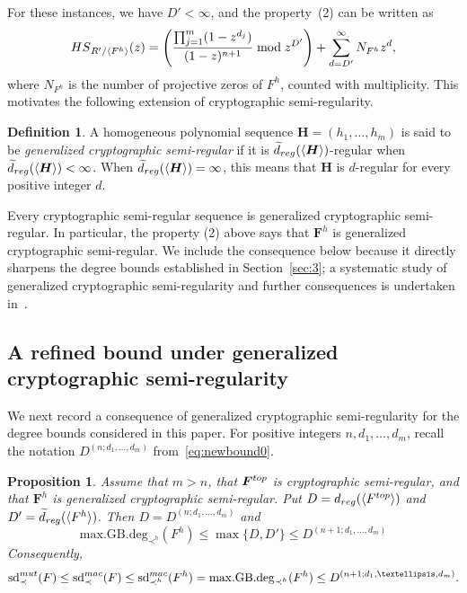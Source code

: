 \documentclass{article}
\newtheorem{proposition}[theorem]{Proposition}
\theoremstyle{definition}
\newtheorem{definition}[theorem]{Definition}
\theoremstyle{plain}
\theoremstyle{plain}
\theoremstyle{plain}
\theoremstyle{plain}
\numberwithin{equation}{subsection}
\begin{document}
For these instances, we have $D'<\infty$, and the property~{\rm (2)} can be written as
\[
{\rm HS}_{R'/\langle F^h\rangle}(z)
=
\left(
\frac{\prod_{j=1}^m(1-z^{d_j})}
     {(1-z)^{n+1}}
\bmod z^{D'}
\right)
+
\sum_{d=D'}^\infty N_{F^h}z^d,
\]
where $N_{F^h}$ is the number of projective zeros of $F^h$, counted with multiplicity.
This motivates the following extension of cryptographic semi-regularity.

\begin{definition}
A homogeneous polynomial sequence $\bm H=(h_1,\ldots,h_m)$ is said to be \emph{generalized cryptographic semi-regular} if it is $\widetilde d_{\rm reg}(\langle\bm H\rangle)$-regular when $\widetilde d_{\rm reg}(\langle\bm H\rangle)<\infty$.
When $\widetilde d_{\rm reg}(\langle\bm H\rangle)=\infty$, this means that $\bm H$ is $d$-regular for every positive integer $d$.
\end{definition}

Every cryptographic semi-regular sequence is generalized cryptographic semi-regular.
In particular, the property {\rm (2)} above says that $\bm F^h$ is generalized cryptographic semi-regular.
We include the consequence below because it directly sharpens the degree bounds established in Section~\ref{sec:3}; a systematic study of generalized cryptographic semi-regularity and further consequences is undertaken in~\cite{KY2}.

\subsection{A refined bound under generalized cryptographic semi-regularity}

We next record a consequence of generalized cryptographic semi-regularity for the degree bounds considered in this paper.
For positive integers $n,d_1,\ldots,d_m$, recall the notation $D^{(n;d_1,\ldots,d_m)}$ from~\eqref{eq:newbound0}.

\begin{proposition}\label{prop:gen-csr-bound}
Assume that $m>n$, that $\bm F^{\rm top}$ is cryptographic semi-regular, and that $\bm F^h$ is generalized cryptographic semi-regular.
Put $D=d_{\rm reg}(\langle F^{\rm top}\rangle)$ and $D'=\widetilde d_{\rm reg}(\langle F^h\rangle)$.
Then $D=D^{(n;d_1,\ldots,d_m)}$ and
\begin{equation}\label{eq:Dnew}
\mathrm{max.GB.deg}_{\prec^h} (F^h) \leq \max \{ D,D'\} \leq  D^{(n+1;d_1,\ldots,d_m)}
\end{equation}
Consequently,
\[
\mathrm{sd}^{\rm mut}_{\prec}(F) \le \mathrm{sd}^{\rm mac}_{\prec}(F) \leq \mathrm{sd}^{\rm mac}_{\prec^h}(F^h)= \mathrm{max.GB.deg}_{\prec^h}(F^h) \le D^{(n+1;d_1,\ldots,d_m)}.
\]
\end{proposition}
\end{document}
